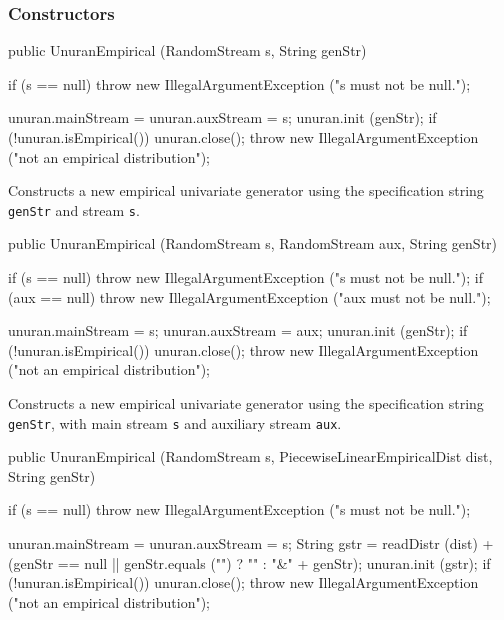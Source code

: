 \subsubsection* {Constructors}
\begin{code}

   public UnuranEmpirical (RandomStream s, String genStr)\begin{hide} {
      if (s == null)
         throw new IllegalArgumentException ("s must not be null.");

      unuran.mainStream = unuran.auxStream = s;
      unuran.init (genStr);
      if (!unuran.isEmpirical()) {
         unuran.close();
         throw new IllegalArgumentException ("not an empirical distribution");
      }
   }\end{hide}
\end{code}
\begin{tabb}
   Constructs a new empirical univariate generator using the specification string
   \texttt{genStr} and stream \texttt{s}.
\end{tabb}
\begin{code}

   public UnuranEmpirical (RandomStream s, RandomStream aux, String genStr)\begin{hide} {
      if (s == null)
         throw new IllegalArgumentException ("s must not be null.");
      if (aux == null)
         throw new IllegalArgumentException ("aux must not be null.");

      unuran.mainStream = s;
      unuran.auxStream = aux;
      unuran.init (genStr);
      if (!unuran.isEmpirical()) {
         unuran.close();
         throw new IllegalArgumentException ("not an empirical distribution");
      }
   }\end{hide}
\end{code}
\begin{tabb}
   Constructs a new empirical univariate generator using the specification string
   \texttt{genStr}, with main stream \texttt{s} and auxiliary stream \texttt{aux}.
\end{tabb}
\begin{code}

   public UnuranEmpirical (RandomStream s,
                           PiecewiseLinearEmpiricalDist dist, String genStr)\begin{hide} {
      if (s == null)
         throw new IllegalArgumentException ("s must not be null.");

      unuran.mainStream = unuran.auxStream = s;
      String gstr = readDistr (dist) + 
        (genStr == null || genStr.equals ("") ? "" : "&" + genStr);
      unuran.init (gstr);
      if (!unuran.isEmpirical()) {
         unuran.close();
         throw new IllegalArgumentException ("not an empirical distribution");
      }
   }\end{hide}
\end{code}
